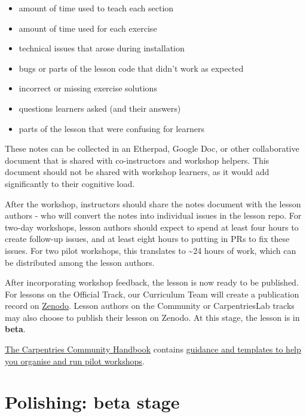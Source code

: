 \documentclass[
]{book}
\providecommand{\tightlist}{%
  \setlength{\itemsep}{0pt}\setlength{\parskip}{0pt}}
\begin{document}
\begin{itemize}
\tightlist
\item
  amount of time used to teach each section
\item
  amount of time used for each exercise
\item
  technical issues that arose during installation
\item
  bugs or parts of the lesson code that didn't work as expected
\item
  incorrect or missing exercise solutions
\item
  questions learners asked (and their answers)
\item
  parts of the lesson that were confusing for learners
\end{itemize}

These notes can be collected in an Etherpad, Google Doc, or other collaborative document that is shared
with co-instructors and workshop helpers. This document should not be shared with workshop learners,
as it would add significantly to their cognitive load.

After the workshop, instructors should share the notes document with the lesson authors - who
will convert the notes into individual issues in the lesson repo. For two-day workshops, lesson authors should expect
to spend at least four hours to create follow-up issues, and at least
eight hours to putting in PRs to fix these issues. For two pilot workshops, this translates
to \textasciitilde24 hours of work, which can be distributed among the lesson authors.

After incorporating workshop feedback, the lesson is
now ready to be published. For lessons on the Official
Track, our Curriculum Team will create a publication
record on \href{https://zenodo.org/communities/carpentries/?page=1\&size=20}{Zenodo}. Lesson authors on the Community or CarpentriesLab tracks
may also choose to publish their lesson on Zenodo. At this stage, the lesson is in \textbf{beta}.

\href{https://docs.carpentries.org/}{The Carpentries Community Handbook} contains
\href{https://docs.carpentries.org/topic_folders/lesson_development/lesson_pilots.html}{guidance and templates to help you organise and run pilot workshops}.

\hypertarget{polishing-beta-stage}{%
\section{Polishing: beta stage}\label{polishing-beta-stage}}
\end{document}
